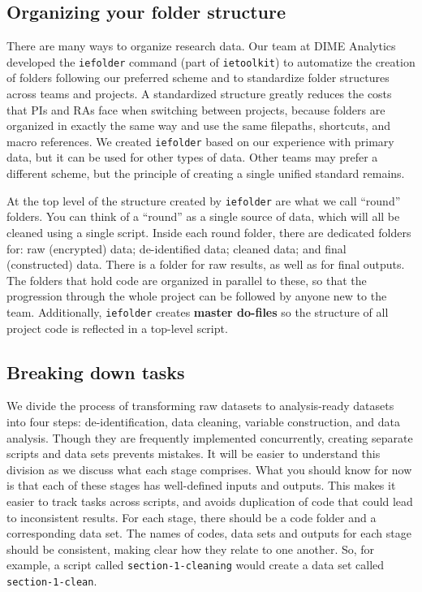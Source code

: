 \subsection{Organizing your folder structure}

There are many ways to organize research data.
Our team at DIME Analytics developed the \texttt{iefolder}
command (part of \texttt{ietoolkit})
to automatize the creation of folders following our preferred scheme and
to standardize folder structures across teams and projects.
A standardized structure greatly reduces the costs that PIs and RAs 
face when switching between projects,
because folders are organized in exactly the same way
and use the same filepaths, shortcuts, and macro references.
We created \texttt{iefolder} based on our experience with primary data,
but it can be used for other types of data.
Other teams may prefer a different scheme, but
the principle of creating a single unified standard remains.

At the top level of the structure created by \texttt{iefolder} are what we call ``round'' folders.
You can think of a ``round'' as a single source of data,
which will all be cleaned using a single script.
Inside each round folder, there are dedicated folders for:
raw (encrypted) data; de-identified data; cleaned data; and final (constructed) data.
There is a folder for raw results, as well as for final outputs.
The folders that hold code are organized in parallel to these,
so that the progression through the whole project can be followed by anyone new to the team.
Additionally, \texttt{iefolder} creates \textbf{master do-files}
so the structure of all project code is reflected in a top-level script.

\subsection{Breaking down tasks}

We divide the process of transforming raw datasets to analysis-ready datasets into four steps:
de-identification, data cleaning, variable construction, and data analysis.
Though they are frequently implemented concurrently,
creating separate scripts and data sets prevents mistakes.
It will be easier to understand this division as we discuss what each stage comprises.
What you should know for now is that each of these stages has well-defined inputs and outputs.
This makes it easier to track tasks across scripts,
and avoids duplication of code that could lead to inconsistent results.
For each stage, there should be a code folder and a corresponding data set.
The names of codes, data sets and outputs for each stage should be consistent,
making clear how they relate to one another.
So, for example, a script called \texttt{section-1-cleaning} would create
a data set called \texttt{section-1-clean}.

